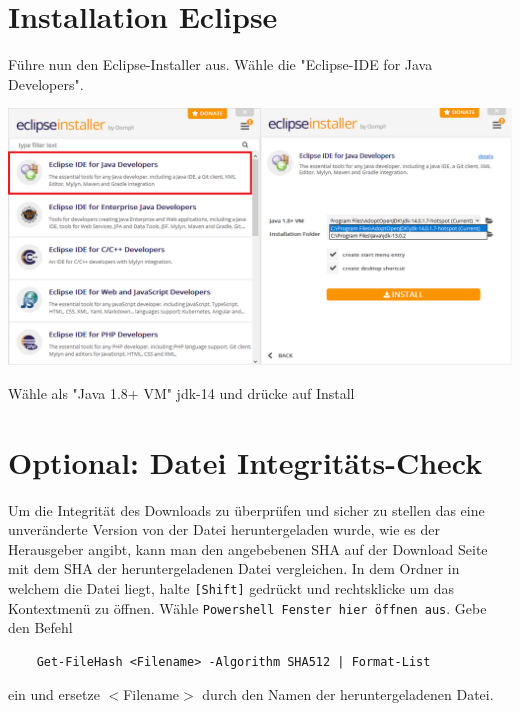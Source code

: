 \documentclass{scrartcl}
\begin{document}
\newpage
\section{Installation Eclipse}
Führe nun den Eclipse-Installer aus. Wähle die "Eclipse-IDE for Java Developers".\\
\begin{center}
    \includegraphics[width=\textwidth]{Screenshot_7.png}
\end{center}
Wähle als "Java 1.8+ VM" jdk-14 und drücke auf Install\\



\section{Optional: Datei Integritäts-Check}
Um die Integrität des Downloads zu überprüfen und sicher zu stellen das eine unveränderte Version von der Datei heruntergeladen wurde, wie es der Herausgeber angibt, kann man den angebebenen SHA auf der Download Seite mit dem SHA der heruntergeladenen Datei vergleichen. In dem Ordner in welchem die Datei liegt, halte \texttt{[Shift]} gedrückt und rechtsklicke um das Kontextmenü zu öffnen. Wähle \texttt{Powershell Fenster hier öffnen aus}. Gebe den Befehl
    \begin{lstlisting}
    Get-FileHash <Filename> -Algorithm SHA512 | Format-List
    \end{lstlisting}

ein und ersetze $<$Filename$>$ durch den Namen der heruntergeladenen Datei.
\end{document}
